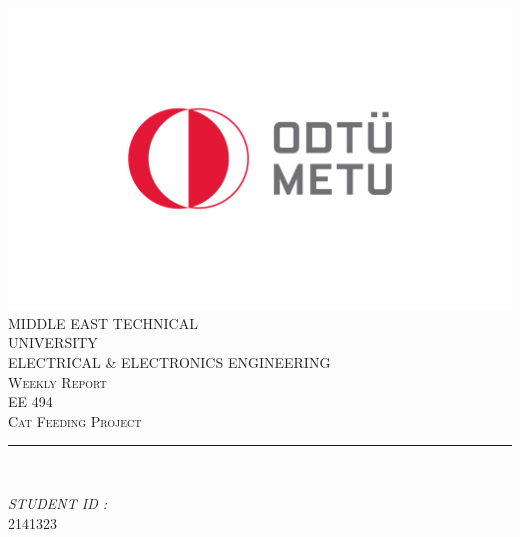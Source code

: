 \begin{titlepage}
	\centering
    \vspace*{0.5 cm}
    \includegraphics[scale = 1.5]{METU_Logo.jpg}\\[0.5 cm]	%
    \textsc{\Large MIDDLE EAST TECHNICAL} \\[0.2 cm]
    \textsc{\Large UNIVERSITY} \\ [1.0 cm]
    \textsc{\large ELECTRICAL \& ELECTRONICS ENGINEERING} \\[0.2 cm]
    \textsc{\large Weekly Report \weekNum}\\[0.2 cm]
	\textsc{\large EE 494}\\[0.5 cm]				%
	\textsc{\large Cat Feeding Project}\\[0.2 cm]
	\rule{\linewidth}{0.2 mm} \\[0.2 cm]
	
	\begin{minipage}{0.4\textwidth}
		
			\begin{flushright} 
			\emph{STUDENT ID :} \\
			2141323\linebreak
		\end{flushright}
	\end{minipage}\\[2 cm]
	
	\vfill
	
\end{titlepage}
